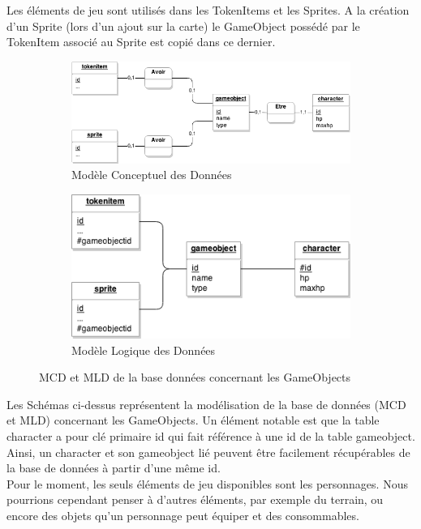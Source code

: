 Les éléments de jeu sont utilisés dans les TokenItems et les Sprites. A la création d'un Sprite (lors d'un ajout sur la carte) le GameObject possédé par le TokenItem associé au Sprite est copié dans ce dernier.\\

\begin{figure}[h!]
        \centering
        \begin{subfigure}[h!]{0.7\textwidth}
                \includegraphics[width=\textwidth]{img/gameobject_MCD.png}
                \caption{Modèle Conceptuel des Données}
        \end{subfigure}

        \begin{subfigure}[h!]{0.5\textwidth}
                \includegraphics[width=\textwidth]{img/gameobject_MLD.png}
                \caption{Modèle Logique des Données}
        \end{subfigure}
        \caption{MCD et MLD de la base données concernant les GameObjects}
        \label{fig:GameObjectsBDD}
\end{figure}

Les Schémas ci-dessus représentent la modélisation de la base de données (MCD et MLD) concernant les GameObjects. Un élément notable est que la table character a pour clé primaire id qui fait référence à une id de la table gameobject. Ainsi, un character et son gameobject lié peuvent être facilement récupérables de la base de données à partir d'une même id.\\

Pour le moment, les seuls éléments de jeu disponibles sont les personnages. Nous pourrions cependant penser à d'autres éléments, par exemple du terrain, ou encore des objets qu'un personnage peut équiper et des consommables.\\